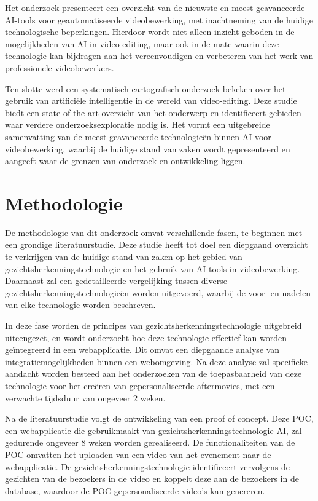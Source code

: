 Het onderzoek presenteert een overzicht van de nieuwste en meest geavanceerde AI-tools voor geautomatiseerde videobewerking, met inachtneming van de huidige technologische beperkingen. Hierdoor wordt niet alleen inzicht geboden in de mogelijkheden van AI in video-editing, maar ook in de mate waarin deze technologie kan bijdragen aan het vereenvoudigen en verbeteren van het werk van professionele videobewerkers.

Ten slotte werd een systematisch cartografisch onderzoek bekeken over het gebruik van artificiële intelligentie in de wereld van video-editing\autocite{IgorBieda}. Deze studie biedt een state-of-the-art overzicht van het onderwerp en identificeert gebieden waar verdere onderzoeksexploratie nodig is. Het vormt een uitgebreide samenvatting van de meest geavanceerde technologieën binnen AI voor videobewerking, waarbij de huidige stand van zaken wordt gepresenteerd en aangeeft waar de grenzen van onderzoek en ontwikkeling liggen.




\section{Methodologie}%
\label{sec:methodologie}

De methodologie van dit onderzoek omvat verschillende fasen, te beginnen met een grondige literatuurstudie. Deze studie heeft tot doel een diepgaand overzicht te verkrijgen van de huidige stand van zaken op het gebied van gezichtsherkenningstechnologie en het gebruik van AI-tools in videobewerking. Daarnaast zal een gedetailleerde vergelijking tussen diverse gezichtsherkenningstechnologieën worden uitgevoerd, waarbij de voor- en nadelen van elke technologie worden beschreven.

In deze fase worden de principes van gezichtsherkenningstechnologie uitgebreid uiteengezet, en wordt onderzocht hoe deze technologie effectief kan worden geïntegreerd in een webapplicatie. Dit omvat een diepgaande analyse van integratiemogelijkheden binnen een webomgeving. Na deze analyse zal specifieke aandacht worden besteed aan het onderzoeken van de toepasbaarheid van deze technologie voor het creëren van gepersonaliseerde aftermovies, met een verwachte tijdsduur van ongeveer 2 weken.

Na de literatuurstudie volgt de ontwikkeling van een proof of concept. Deze POC, een webapplicatie die gebruikmaakt van gezichtsherkenningstechnologie AI, zal gedurende ongeveer 8 weken worden gerealiseerd. De functionaliteiten van de POC omvatten het uploaden van een video van het evenement naar de webapplicatie. De gezichtsherkenningstechnologie identificeert vervolgens de gezichten van de bezoekers in de video en koppelt deze aan de bezoekers in de database, waardoor de POC gepersonaliseerde video's kan genereren.

